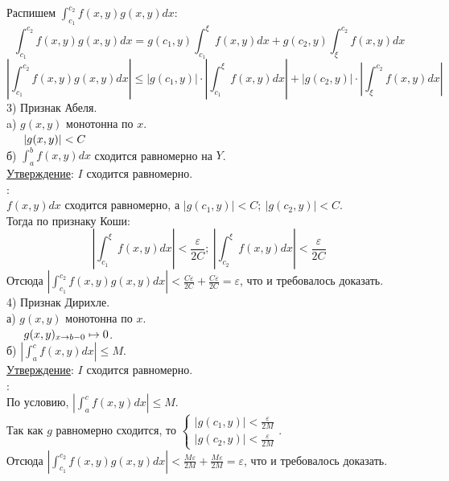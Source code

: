 \documentclass[12pt]{article}
\begin{document}
Распишем $\int_{c_1}^{c_2} f(x,y) g(x,y) dx$:\\
$$\int_{c_1}^{c_2} f(x,y) g(x,y) dx = g(c_1,y) \int_{c_1}^{\xi} f(x,y) dx + g(c_2,y) \int_{\xi}^{c_2} f(x,y)dx$$
$$|\int_{c_1}^{c_2} f(x,y) g(x,y) dx|\leq |g(c_1,y)| \cdot |\int_{c_1}^{\xi} f(x,y) dx| + |g(c_2,y) | \cdot |\int_{\xi}^{c_2} f(x,y)dx|$$
3) Признак Абеля.\\
a) $g(x,y)$ монотонна по $x$.\\
$\indent |g(x,y)|<C$\\
б) $\int_a^b f(x,y) dx$ сходится равномерно на $Y$.\\
\uline{Утверждение}: $I$ сходится равномерно.\\
:\\
$f(x,y)dx$ сходится равномерно, а $|g(c_1,y)| < C; \ |g(c_2,y)| < C$.\\
Тогда по признаку Коши:\\
$$|\int_{c_1}^{\xi} f(x,y)dx| < \frac{\varepsilon}{2C}; \ |\int_{c_2}^{\xi} f(x,y)dx| < \frac{\varepsilon}{2C}$$
Отсюда $|\int_{c_1}^{c_2} f(x,y)g(x,y) dx| < \frac {C \varepsilon}{2C} + \frac {C \varepsilon}{2C} = \varepsilon$, что и требовалось доказать.\\
4) Признак Дирихле.\\
а) $g(x,y)$ монотонна по $x$.\\
$\indent g(x,y)_{x \to b-0} \mapsto 0$.\\
б) $|\int_a^c f(x,y) dx| \leq M$.\\
\uline{Утверждение}: $I$ сходится равномерно.\\
:\\
По условию, $|\int_a^c f(x,y) dx| \leq M$.\\
Так как $g$ равномерно сходится, то $\begin{cases} |g(c_1, y)| < \frac{\varepsilon}{2M} \\ |g(c_2, y)| < \frac{\varepsilon}{2M} \end{cases}$.\\
Отсюда $|\int_{c_1}^{c_2} f(x,y)g(x,y) dx| < \frac {M \varepsilon}{2M} + \frac {M \varepsilon}{2M} = \varepsilon$, что и требовалось доказать.\\
\end{document}
